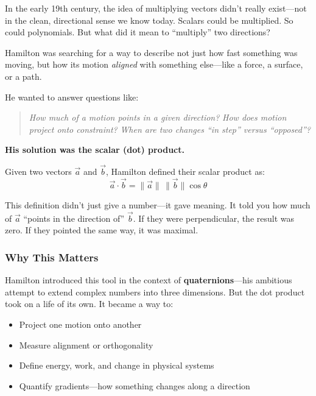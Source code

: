 In the early 19th century, the idea of multiplying vectors didn’t really exist—not in the clean, directional sense we know today. Scalars could be multiplied. So could polynomials. But what did it mean to “multiply” two directions?

\medskip

Hamilton was searching for a way to describe not just how fast something was moving, but how its motion \textit{aligned} with something else—like a force, a surface, or a path.

He wanted to answer questions like:

\begin{quote}
\textit{How much of a motion points in a given direction?}  
\textit{How does motion project onto constraint?}  
\textit{When are two changes “in step” versus “opposed”?}
\end{quote}

\textbf{His solution was the scalar (dot) product.}

Given two vectors \( \vec{a} \) and \( \vec{b} \), Hamilton defined their scalar product as:
\[
\vec{a} \cdot \vec{b} = \|\vec{a}\| \, \|\vec{b}\| \cos\theta
\]

This definition didn’t just give a number—it gave meaning. It told you how much of \( \vec{a} \) “points in the direction of” \( \vec{b} \). If they were perpendicular, the result was zero. If they pointed the same way, it was maximal.

\subsubsection*{Why This Matters}

Hamilton introduced this tool in the context of \textbf{quaternions}—his ambitious attempt to extend complex numbers into three dimensions. But the dot product took on a life of its own. It became a way to:

\begin{itemize}
    \item Project one motion onto another
    \item Measure alignment or orthogonality
    \item Define energy, work, and change in physical systems
    \item Quantify gradients—how something changes along a direction
\end{itemize}

